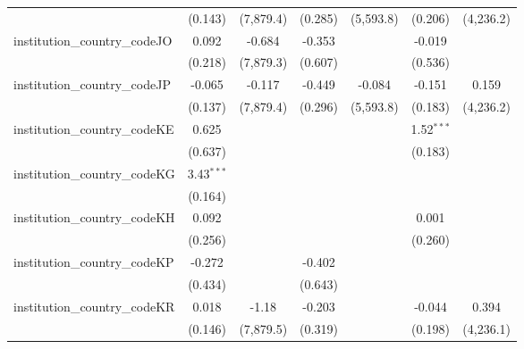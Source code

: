 \begin{tabular}{lcccccc}
                                         & (0.143)        & (7,879.4)     & (0.285)        & (5,593.8)     & (0.206)        & (4,236.2)\\   
   institution\_country\_codeJO          & 0.092          & -0.684        & -0.353         &               & -0.019         &   \\   
                                         & (0.218)        & (7,879.3)     & (0.607)        &               & (0.536)        &   \\   
   institution\_country\_codeJP          & -0.065         & -0.117        & -0.449         & -0.084        & -0.151         & 0.159\\   
                                         & (0.137)        & (7,879.4)     & (0.296)        & (5,593.8)     & (0.183)        & (4,236.2)\\   
   institution\_country\_codeKE          & 0.625          &               &                &               & 1.52$^{***}$   &   \\   
                                         & (0.637)        &               &                &               & (0.183)        &   \\   
   institution\_country\_codeKG          & 3.43$^{***}$   &               &                &               &                &   \\   
                                         & (0.164)        &               &                &               &                &   \\   
   institution\_country\_codeKH          & 0.092          &               &                &               & 0.001          &   \\   
                                         & (0.256)        &               &                &               & (0.260)        &   \\   
   institution\_country\_codeKP          & -0.272         &               & -0.402         &               &                &   \\   
                                         & (0.434)        &               & (0.643)        &               &                &   \\   
   institution\_country\_codeKR          & 0.018          & -1.18         & -0.203         &               & -0.044         & 0.394\\   
                                         & (0.146)        & (7,879.5)     & (0.319)        &               & (0.198)        & (4,236.1)\\   

\end{tabular}
